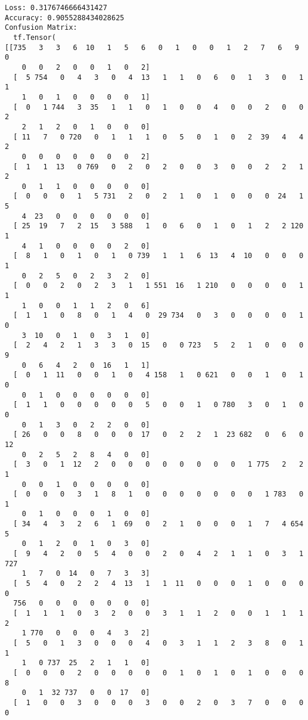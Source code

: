 \documentclass[12pt, titlepage]{article}
\begin{document}
\begin{verbatim}
Loss: 0.3176746666431427
Accuracy: 0.9055288434028625
Confusion Matrix:
  tf.Tensor(
[[735   3   3   6  10   1   5   6   0   1   0   0   1   2   7   6   9   0
    0   0   2   0   0   1   0   2]
  [  5 754   0   4   3   0   4  13   1   1   0   6   0   1   3   0   1   1
    1   0   1   0   0   0   0   1]
  [  0   1 744   3  35   1   1   0   1   0   0   4   0   0   2   0   0   2
    2   1   2   0   1   0   0   0]
  [ 11   7   0 720   0   1   1   1   0   5   0   1   0   2  39   4   4   2
    0   0   0   0   0   0   0   2]
  [  1   1  13   0 769   0   2   0   2   0   0   3   0   0   2   2   1   2
    0   1   1   0   0   0   0   0]
  [  0   0   0   1   5 731   2   0   2   1   0   1   0   0   0  24   1   5
    4  23   0   0   0   0   0   0]
  [ 25  19   7   2  15   3 588   1   0   6   0   1   0   1   2   2 120   1
    4   1   0   0   0   0   2   0]
  [  8   1   0   1   0   1   0 739   1   1   6  13   4  10   0   0   0   1
    0   2   5   0   2   3   2   0]
  [  0   0   2   0   2   3   1   1 551  16   1 210   0   0   0   0   1   1
    1   0   0   1   1   2   0   6]
  [  1   1   0   8   0   1   4   0  29 734   0   3   0   0   0   0   1   0
    3  10   0   1   0   3   1   0]
  [  2   4   2   1   3   3   0  15   0   0 723   5   2   1   0   0   0   9
    0   6   4   2   0  16   1   1]
  [  0   1  11   0   0   1   0   4 158   1   0 621   0   0   1   0   1   0
    0   1   0   0   0   0   0   0]
  [  1   1   0   0   0   0   0   5   0   0   1   0 780   3   0   1   0   0
    0   1   3   0   2   2   0   0]
  [ 26   0   0   8   0   0   0  17   0   2   2   1  23 682   0   6   0  12
    0   2   5   2   8   4   0   0]
  [  3   0   1  12   2   0   0   0   0   0   0   0   0   1 775   2   2   1
    0   0   1   0   0   0   0   0]
  [  0   0   0   3   1   8   1   0   0   0   0   0   0   0   1 783   0   1
    0   1   0   0   0   1   0   0]
  [ 34   4   3   2   6   1  69   0   2   1   0   0   0   1   7   4 654   5
    0   1   2   0   1   0   3   0]
  [  9   4   2   0   5   4   0   0   2   0   4   2   1   1   0   3   1 727
    1   7   0  14   0   7   3   3]
  [  5   4   0   2   2   4  13   1   1  11   0   0   0   1   0   0   0   0
  756   0   0   0   0   0   0   0]
  [  1   1   1   0   3   2   0   0   3   1   1   2   0   0   1   1   1   2
    1 770   0   0   0   4   3   2]
  [  5   0   1   3   0   0   0   4   0   3   1   1   2   3   8   0   1   1
    1   0 737  25   2   1   1   0]
  [  0   0   0   2   0   0   0   0   0   1   0   1   0   1   0   0   0   8
    0   1  32 737   0   0  17   0]
  [  1   0   0   3   0   0   0   3   0   0   2   0   3   7   0   0   0   0

\end{verbatim}
\end{document}
